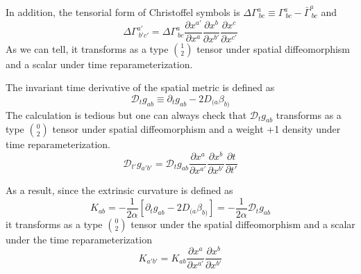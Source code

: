 \documentclass[letterpaper,nofootinbib,prd,amsmath,onecolumn]{revtex4-1}
\begin{document}
In addition, the tensorial form of Christoffel symbols is $\Delta \Gamma^{a}_{~bc} \equiv \Gamma^{a}_{~bc} - {\bar \Gamma}^{a}_{~bc}$ and
\begin{equation}
\Delta \Gamma^{a'}_{~b'c'} = \Delta \Gamma^{a}_{~bc}\frac{\partial x^{a'}}{\partial x^{a}}\frac{\partial x^{b}}{\partial x^{b'}}\frac{\partial x^{c}}{\partial x^{c'}}
\end{equation}
As we can tell, it transforms as a type $1 \choose 2$ tensor under spatial diffeomorphism and a scalar under time reparameterization. 

The invariant time derivative of the spatial metric is defined as
\begin{equation}
\mathscr{D}_{t}g_{ab} \equiv \partial_{t}g_{ab} - 2D_{(a}\beta_{b)}
\end{equation}
The calculation is tedious but one can always check that $\mathscr{D}_{t}g_{ab}$ transforms as a type $0 \choose 2$ tensor under spatial diffeomorphism and a weight +1 density under time reparameterization. 
\begin{equation}
\mathscr{D}_{t'}g_{a'b'} = \mathscr{D}_{t}g_{ab}\frac{\partial x^{a}}{\partial x^{a'}}\frac{\partial x^{b}}{\partial x^{b'}}\frac{\partial t}{\partial t'}
\end{equation}

As a result, since the extrinsic curvature is defined as
\begin{equation}
K_{ab} = -\frac{1}{2\alpha}[\partial_{t}g_{ab} - 2D_{(a}\beta_{b)}] = -\frac{1}{2\alpha}\mathscr{D}_{t}g_{ab}
\end{equation}
it transforms as a type $0 \choose 2$ tensor under the spatial diffeomorphism and a scalar under the time reparameterization
\begin{equation}
K_{a'b'} = K_{ab}\frac{\partial x^{a}}{\partial x^{a'}}\frac{\partial x^{b}}{\partial x^{b'}}
\end{equation}
\end{document}
